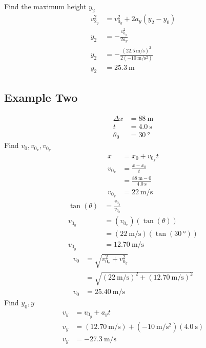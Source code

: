 \documentclass{article}
\begin{document}
Find the maximum height $ y_2 $
\begin{align*}
	v_{2_y}^2 & = v_{0_y}^2 + 2a_y(y_2 - y_0) \\
	y_2 & = -\frac{v_{0_y}^2}{2a_y} \\
	y_2 & = -\frac{(\SI{22.5}{\meter \per \second})^2}{2(\SI{-10}{\meter \per \second \squared})} \\
	y_2 & = \SI{25.3}{\meter}
\end{align*}

\subsection{Example Two}
\begin{align*}
	\Delta x & = \SI{88}{\meter} \\
	t & = \SI{4.0}{\second} \\
	\theta_0 & = \SI{30}{\degree}
\end{align*}
Find $ v_0, v_{0_x}, v_{0_y} $
\begin{align*}
	x & = x_0 + v_{0_x}t \\
	v_{0_x} & = \frac{x - x_0}{t} \\
			& = \frac{\SI{88}{\meter} - 0}{\SI{4.0}{\second}} \\
	v_{0_x} & = \SI{22}{\meter \per \second}
\end{align*}
\begin{align*}
	\tan(\theta) & = \frac{v_{0_y}}{v_{0_x}} \\
	v_{0_y} & = (v_{0_x})(\tan(\theta)) \\
			& = (\SI{22}{\meter \per \second})(\tan(\SI{30}{\degree})) \\
	v_{0_y} & = \SI{12.70}{\meter \per \second}
\end{align*}
\begin{align*}
	v_0 & = \sqrt{v_{0_x}^2 + v_{0_y}^2} \\
		& = \sqrt{(\SI{22}{\meter \per \second})^2 + (\SI{12.70}{\meter \per \second})^2} \\
	v_0 & = \SI{25.40}{\meter \per \second}
\end{align*}
Find $ y_0, y $
\begin{align*}
	v_y & = v_{0_y} + a_yt \\
	v_y & = (\SI{12.70}{\meter \per \second}) + (\SI{-10}{\meter \per \second \squared})(\SI{4.0}{\second}) \\
	v_y & = \SI{-27.3}{\meter \per \second}
\end{align*}
\end{document}
